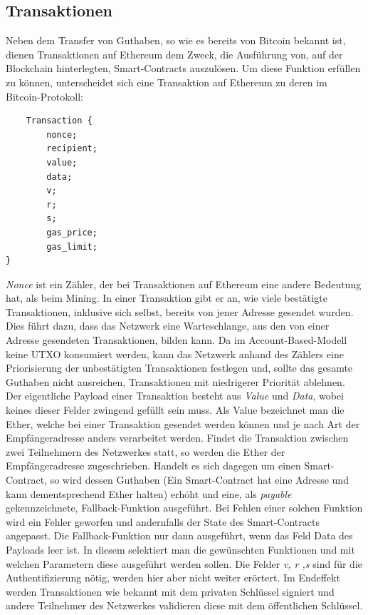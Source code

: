 \subsection{Transaktionen}
Neben dem Transfer von Guthaben, so wie es bereits von Bitcoin bekannt ist, dienen Transaktionen auf Ethereum dem Zweck, die Ausführung von, auf der Blockchain hinterlegten, Smart-Contracts auszulösen.
Um diese Funktion erfüllen zu können, unterscheidet sich eine Transaktion auf Ethereum zu deren im Bitcoin-Protokoll:
\begin{lstlisting}
	Transaction {
		nonce;
		recipient;
		value;
		data;
		v;
		r;
		s;	
		gas_price;
		gas_limit;
}
\end{lstlisting}
\emph{Nonce} ist ein Zähler, der bei Transaktionen auf Ethereum eine andere Bedeutung hat, als beim Mining. In einer Transaktion gibt er an, wie viele bestätigte Transaktionen, inklusive sich selbst, bereits von jener Adresse gesendet wurden. Dies führt dazu, dass das Netzwerk eine Warteschlange, aus den von einer Adresse gesendeten Transaktionen, bilden kann. Da im Account-Based-Modell keine UTXO konsumiert werden, kann das Netzwerk anhand des Zählers eine Priorisierung der unbestätigten Transaktionen festlegen und, sollte das gesamte Guthaben nicht ausreichen, Transaktionen mit niedrigerer Priorität ablehnen.\\
Der eigentliche Payload einer Transaktion besteht aus \emph{Value} und \emph{Data}, wobei keines dieser Felder zwingend gefüllt sein muss.
Als Value bezeichnet man die Ether, welche bei einer Transaktion gesendet werden können und je nach Art der Empfängeradresse anders verarbeitet werden. Findet die Transaktion zwischen zwei Teilnehmern des Netzwerkes statt, so werden die Ether der Empfängeradresse zugeschrieben. Handelt es sich dagegen um einen Smart-Contract, so wird dessen Guthaben (Ein Smart-Contract hat eine Adresse und kann dementsprechend Ether halten) erhöht und eine, als \emph{payable} gekennzeichnete, Fallback-Funktion ausgeführt. Bei Fehlen einer solchen Funktion wird ein Fehler geworfen und andernfalls der State des Smart-Contracts angepasst.
Die Fallback-Funktion nur dann ausgeführt, wenn das Feld Data des Payloads leer ist. In diesem selektiert man die gewünschten Funktionen und mit welchen Parametern diese ausgeführt werden sollen. Die Felder \emph{v, r ,s} sind für die Authentifizierung nötig, werden hier aber nicht weiter erörtert. Im Endeffekt werden Transaktionen wie bekannt mit dem privaten Schlüssel signiert und andere Teilnehmer des Netzwerkes validieren diese mit dem öffentlichen Schlüssel.\\
